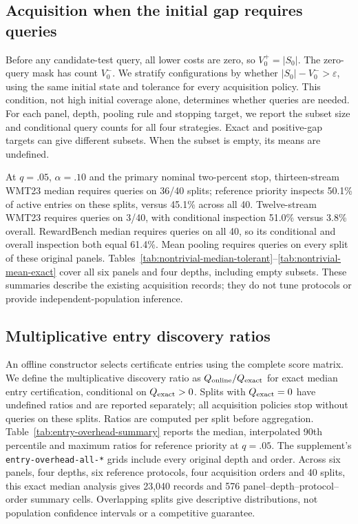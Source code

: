 \subsection{Acquisition when the initial gap requires queries}
\label{app:nontrivial}
Before any candidate-test query, all lower costs are zero, so $V^+_0=|S_0|$. The zero-query mask has count $V^-_0$. We stratify configurations by whether $|S_0|-V^-_0>\varepsilon$, using the same initial state and tolerance for every acquisition policy. This condition, not high initial coverage alone, determines whether queries are needed. For each panel, depth, pooling rule and stopping target, we report the subset size and conditional query counts for all four strategies. Exact and positive-gap targets can give different subsets. When the subset is empty, its means are undefined.

At $q=.05$, $\alpha=.10$ and the primary nominal two-percent stop, thirteen-stream WMT23 median requires queries on 36/40 splits; reference priority inspects 50.1\% of active entries on these splits, versus 45.1\% across all 40. Twelve-stream WMT23 requires queries on 3/40, with conditional inspection 51.0\% versus 3.8\% overall. RewardBench median requires queries on all 40, so its conditional and overall inspection both equal 61.4\%. Mean pooling requires queries on every split of these original panels. Tables~\ref{tab:nontrivial-median-tolerant}--\ref{tab:nontrivial-mean-exact} cover all six panels and four depths, including empty subsets. These summaries describe the existing acquisition records; they do not tune protocols or provide independent-population inference.




\subsection{Multiplicative entry discovery ratios}
An offline constructor selects certificate entries using the complete score matrix. We define the multiplicative discovery ratio as $Q_{\rm online}/Q_{\rm exact}$ for exact median entry certification, conditional on $Q_{\rm exact}>0$. Splits with $Q_{\rm exact}=0$ have undefined ratios and are reported separately; all acquisition policies stop without queries on these splits. Ratios are computed per split before aggregation. Table~\ref{tab:entry-overhead-summary} reports the median, interpolated 90th percentile and maximum ratios for reference priority at $q=.05$. The supplement's \texttt{entry-overhead-all-*} grids include every original depth and order. Across six panels, four depths, six reference protocols, four acquisition orders and 40 splits, this exact median analysis gives 23,040 records and 576 panel--depth--protocol--order summary cells. Overlapping splits give descriptive distributions, not population confidence intervals or a competitive guarantee.

